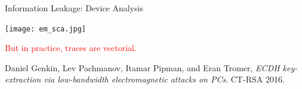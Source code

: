\documentclass{beamer}
\begin{document}
\begin{frame}{Information Leakage: \dotfill Device Analysis}
	\vspace{-0.9cm}
	\begin{center}
		\texttt{[image: em\_sca.jpg]}
\begin{center}
\textcolor{red}{But in practice, traces are vectorial.}
\end{center}

		\medskip

		\scriptsize Daniel Genkin, Lev Pachmanov, Itamar Pipman, and Eran Tromer, \textit{ECDH key-extraction via low-bandwidth electromagnetic attacks on PCs}. CT-RSA 2016.
	\end{center}
\end{frame}
\end{document}
